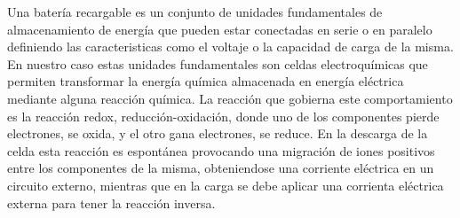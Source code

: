 
Una batería recargable es un conjunto de unidades fundamentales de almacenamiento
de energía que pueden estar conectadas en serie o en paralelo definiendo las 
caracteristicas como el voltaje o la capacidad de carga de la misma. En nuestro 
caso estas unidades fundamentales son celdas electroquímicas que permiten 
transformar la energía química almacenada en energía eléctrica mediante alguna 
reacción química. La reacción que gobierna este comportamiento es la reacción 
redox, reducción-oxidación, donde uno de los componentes pierde electrones, se 
oxida, y el otro gana electrones, se reduce. En la descarga de la celda esta 
reacción es espontánea provocando una migración de iones positivos entre los 
componentes de la misma, obteniendose una corriente eléctrica en un circuito 
externo, mientras que en la carga se debe aplicar una corrienta eléctrica externa
para tener la reacción inversa.

